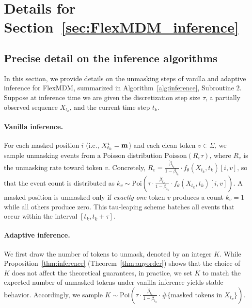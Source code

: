 \section{Details for Section~\ref{sec:FlexMDM_inference}}
\label{sec:appendix_theory_inference}

\subsection{Precise detail on the inference algorithms}
In this section, we provide details on the unmasking steps of vanilla and adaptive inference for FlexMDM, summarized in Algorithm~\ref{alg:inference}, Subroutine 2. Suppose at inference time we are given the discretization step size $\tau$, a partially observed sequence $X_{t_k}$, and the current time step $t_{k}$.

\paragraph{Vanilla inference.} 
For each masked position $i$ (i.e., $X_{t_k}^i = \mathbf{m}$) and each clean token $v \in \Sigma$, we sample unmasking events from a Poisson distribution $\mathrm{Poisson}(R_v \tau)$, where $R_v$ is the unmasking rate toward token $v$. 
Concretely, $R_v = \frac{\dot{\beta}_{t_k}}{1-\beta_{t_k}} \cdot f_\theta(X_{t_k}, t_k)[i,v]$,
so that the event count is distributed as
$k_v \sim \mathrm{Poi}\left(\tau \cdot \tfrac{\dot{\beta}_{t_k}}{1-\beta_{t_k}} \cdot f_\theta(X_{t_k}, t_k)[i,v]\right)$. A masked position is unmasked only if \emph{exactly one} token $v$ produces a count $k_v = 1$ while all others produce zero. This tau-leaping scheme batches all events that occur within the interval $[t_k, t_k+\tau]$.

\paragraph{Adaptive inference.} 
We first draw the number of tokens to unmask, denoted by an integer $K$. While Proposition~\ref{thm:inference} (Theorem~\ref{thm:anyorder}) shows that the choice of $K$ does not affect the theoretical guarantees, in practice, we set $K$ to match the expected number of unmasked tokens under vanilla inference yields stable behavior. Accordingly, we sample
$K \sim \mathrm{Poi}\!\left(\tau \cdot \tfrac{\dot{\beta}_{t_k}}{1-\beta_{t_k}} \cdot \#\{\text{masked tokens in } X_{t_k}\}\right)$.


